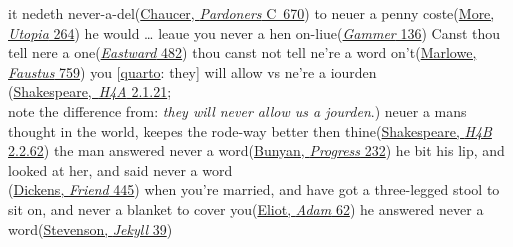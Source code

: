 \ea \label{ex:02-27a}
\ea
it nedeth never-a-del\hfill(\href{https://archive.org/details/completeworksofg04chauuoft/completeworksofg04chauuoft/page/310/mode/2up?q=%22it+nedeth%22&view=theater}{Chaucer, \textit{Pardoners} C~670}) %
\ex
to neuer a penny coste\hfill(\href{https://archive.org/details/utopiasirthomas00robigoog/page/n375/mode/2up?q=%22penny+coste%22&view=theater}{More, \textit{Utopia} 264})
\ex
he would {\dots} leaue you never a hen on-liue\hfill(\href{https://archive.org/details/gammergvrtonsned0000mrsm/page/46/mode/2up?q=%22And+leue+you+neuer+a+hen+on+liue%22%22&view=theater}{\textit{Gammer} 136})
\ex
Canst thou tell nere a one\hfill(\href{https://archive.org/details/representativee02unkngoog/page/482/mode/2up?q=%22Canst+thou+tell+nere+a+one%22&view=theater}{\textit{Eastward} 482})
\ex
{}thou canst not tell ne're a word on't\hfill(\href{https://babel.hathitrust.org/cgi/pt?id=uiuo.ark:/13960/t1pg73v3n&seq=137&q1=thou+canst+not+tell}{Marlowe, \textit{Faustus} 759})
\ex
you [\href{https://internetshakespeare.uvic.ca/doc/1H4_Q1/complete/index.html#tln-650}{quarto}: they] will allow vs ne're a iourden\\\hfill(\href{https://internetshakespeare.uvic.ca/doc/1H4_F1/scene/2.1/index.html#tln-650}{Shakespeare,~\textit{H4A} 2.1.21};\\\hfill note the difference from: \textit{they will never allow us a jourden}.) %
\ex
neuer a mans thought in the world, keepes the rode-way better then thine\hfill(\href{https://internetshakespeare.uvic.ca/doc/2H4_F1/scene/2.2/index.html#tln-835}{Shakespeare, \textit{H4B} 2.2.62}) %
\ex
the man answered never a word\hfill(\href{https://archive.org/details/pilgrimsprogress03bunyanj/page/144/mode/2up?q=%22the+man+answered+never+a+word%22&view=theater}{Bunyan, \textit{Progress} 232})
\ex
he bit his lip, and looked at her, and said never a word\\\hfill(\href{https://archive.org/details/ourmutualfriendc0000char/page/330/mode/2up?q=%22bit+his+lip%22&view=theater}{Dickens, \textit{Friend} 445}) %
\ex
when you're married, and have got a three-legged stool to sit on, and never a blanket to cover you\hfill(\href{https://archive.org/details/adambede01eli/page/134/mode/2up?q=%22and+never+a+blanket+to+cover+you%22&view=theater}{Eliot, \textit{Adam} 62})
\ex
he answered never a word\hfill(\href{https://archive.org/details/dli.ministry.23383/page/39/mode/2up?q=%22answered+never+a+word%22&view=theater}{Stevenson, \textit{Jekyll} 39})
